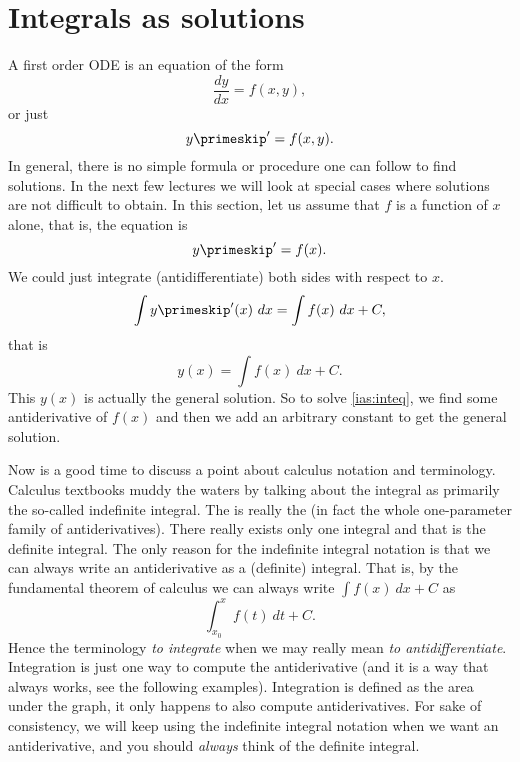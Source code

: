 \section{Integrals as solutions}\label{sec:ODE_int_sol}


A first order ODE is an equation of the form
\begin{equation*}
\frac{dy}{dx} = f(x,y) ,
\end{equation*}
or just
\begin{equation*}
y\primeskip ' = f(x,y) .
\end{equation*}
In general, there is no simple formula or procedure one can follow to find
solutions.
In the next few lectures we will look at special cases where solutions are not
difficult to obtain.
In this section, let us assume that $f$ is a function of $x$ alone,
that is, the equation is
\begin{equation} \label{ias:inteq}
y\primeskip ' = f(x) .
\end{equation}
We could just integrate (antidifferentiate) both sides with respect to $x$.
\begin{equation*}
\int y\primeskip '(x) ~dx = \int f(x) ~dx + C ,
\end{equation*}
that is
\begin{equation*}
y(x) = \int f(x) ~dx + C .
\end{equation*}
This $y(x)$ is actually the general solution.
So to solve \eqref{ias:inteq},
we find some antiderivative of $f(x)$
and then we add an arbitrary constant to get the general solution.

\medskip

Now is a good time to discuss a point about
calculus notation and terminology.  Calculus
textbooks muddy the waters by talking about the integral as primarily the
so-called indefinite integral.  The 
is really the 
(in fact the whole one-parameter family
of antiderivatives).  There really exists only one integral and that
is the definite integral.
The only reason for the indefinite integral notation is that we can always
write an antiderivative as a (definite) integral.  That is, by the fundamental
theorem of calculus we can always write
$\int f(x) ~dx + C$ as
\begin{equation*}
\int_{x_0}^x f(t) ~dt + C .
\end{equation*}
Hence the terminology \emph{to integrate} when we may really mean
\emph{to antidifferentiate}.
Integration is just one way to compute the
antiderivative (and it is a way that always works, see the following
examples).  Integration is defined as the area under the graph, it
only happens to also compute antiderivatives.
For sake of consistency, we will keep using the
indefinite integral notation when we want an antiderivative,
and you should \emph{always} think of the definite integral.\\

